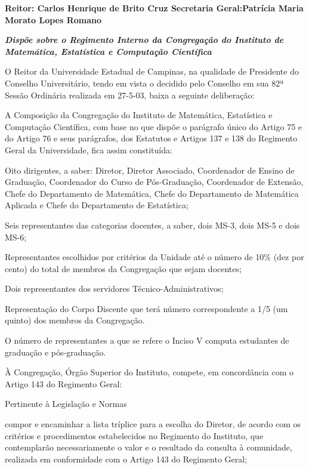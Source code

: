 \documentclass{documento}
\begin{document}
\noindent\textbf{Reitor: Carlos Henrique de Brito Cruz
Secretaria Geral:Patrícia Maria Morato Lopes Romano}

\noindent\textbf{\textit{Dispõe sobre o Regimento Interno da Congregação do Instituto de Matemática, Estatística e Computação Científica}}

\noindent O Reitor da Universidade Estadual de Campinas, na qualidade de Presidente do Conselho Universitário, tendo em vista o decidido pelo Conselho em sua 82ª Sessão Ordinária realizada em 27-5-03, baixa a seguinte deliberação:



\artigo A Composição da Congregação do Instituto de Matemática, Estatística e Computação Científica, com base no que dispõe o parágrafo único do Artigo 75 e do Artigo 76 e seus parágrafos, dos Estatutos e Artigos 137 e 138 do Regimento Geral da Universidade, fica assim constituída:

\inciso Oito dirigentes, a saber: Diretor, Diretor Associado, Coordenador de Ensino de Graduação, Coordenador do Curso de Pós-Graduação, Coordenador de Extensão, Chefe do Departamento de Matemática, Chefe do Departamento de Matemática Aplicada e Chefe do Departamento de Estatística;

\inciso Seis representantes das categorias docentes, a saber, dois MS-3, dois MS-5 e dois MS-6;

\inciso Representantes escolhidos por critérios da Unidade até o número de 10\% (dez por cento) do total de membros da Congregação que sejam docentes;

\inciso Dois representantes dos servidores Técnico-Administrativos;

\inciso Representação do Corpo Discente que terá número correspondente a 1/5 (um quinto) dos membros da Congregação. 

\paragrafounico O número de representantes a que se refere o Inciso V computa estudantes de graduação e pós-graduação.


\artigo À Congregação, Órgão Superior do Instituto, compete, em concordância com o Artigo 143 do Regimento Geral: 

\inciso Pertinente à Legislação e Normas

\subinciso compor e encaminhar a lista tríplice para a escolha do Diretor, de acordo com os critérios e procedimentos estabelecidos no Regimento do Instituto, que contemplarão necessariamente o valor e o resultado da consulta à comunidade, realizada em conformidade com o Artigo 143 do Regimento Geral;
    
\end{document}
